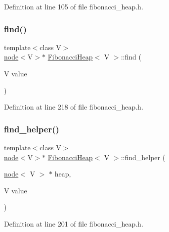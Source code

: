 Definition at line 105 of file fibonacci\+\_\+heap.\+h.

\mbox{\label{class_fibonacci_heap_ae6083007b440bd41d8adbd44c9bb7636}} 
\subsubsection{\texorpdfstring{find()}{find()}}
{\footnotesize\ttfamily template$<$class V$>$ \\
\hyperlink{structnode}{node}$<$V$>$$\ast$ \hyperlink{class_fibonacci_heap}{Fibonacci\+Heap}$<$ V $>$\+::find (\begin{DoxyParamCaption}\item[{V}]{value }\end{DoxyParamCaption})\hspace{0.3cm}{\ttfamily [inline]}}



Definition at line 218 of file fibonacci\+\_\+heap.\+h.

\mbox{\label{class_fibonacci_heap_a215c1e3fbf82b73f7548ef9b2e4420e3}} 
\subsubsection{\texorpdfstring{find\+\_\+helper()}{find\_helper()}}
{\footnotesize\ttfamily template$<$class V$>$ \\
\hyperlink{structnode}{node}$<$V$>$$\ast$ \hyperlink{class_fibonacci_heap}{Fibonacci\+Heap}$<$ V $>$\+::find\+\_\+helper (\begin{DoxyParamCaption}\item[{\hyperlink{structnode}{node}$<$ V $>$ $\ast$}]{heap,  }\item[{V}]{value }\end{DoxyParamCaption})\hspace{0.3cm}{\ttfamily [inline]}}



Definition at line 201 of file fibonacci\+\_\+heap.\+h.

\mbox{\label{class_fibonacci_heap_a63cc52318444c719a45f75a3b0698d31}} 
